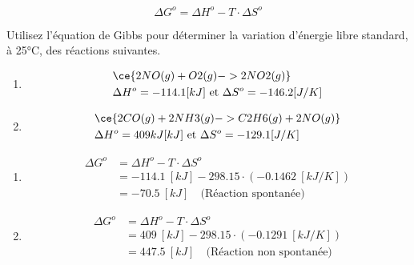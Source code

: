 \documentclass[
  11pt,
  a4paper,
  openany]{book}
\providecommand{\tightlist}{%
  \setlength{\itemsep}{0pt}\setlength{\parskip}{0pt}}
\begin{document}
\[
\Delta G^o = \Delta H^o - T \cdot \Delta S^o
\]

\begin{Exercise}

Utilisez l'équation de Gibbs pour déterminer la variation d'énergie libre standard, à 25°C, des réactions suivantes.

\begin{enumerate}
\def\labelenumi{\alph{enumi}.}
\tightlist
\item
  \[
  \begin{split}
  & \ce{2 NO(g) + O2(g) -> 2 NO2(g)} \\
  & \Delta H^o = -114.1 [kJ] \text{ et } \Delta S^o = -146.2 [J/K]
  \end{split}
  \]
\item
  \[
  \begin{split}
  & \ce{2 CO(g) + 2 NH3(g) -> C2H6(g) + 2 NO(g)} \\
  & \Delta H^o = 409 kJ [kJ] \text{ et } \Delta S^o = -129.1 [J/K]
  \end{split}
  \]
\end{enumerate}

\end{Exercise}

\begin{Answer}

\begin{enumerate}
\def\labelenumi{\alph{enumi}.}
\tightlist
\item
  \[
  \begin{split}
  \Delta G^o &= \Delta H^o - T \cdot \Delta S^o \\
  &= -114.1\ [kJ] - 298.15 \cdot (-0.1462\ [kJ/K]) \\
  &= -70.5\ [kJ] \quad \text{(Réaction spontanée)}
  \end{split}
  \]
\item
  \[
  \begin{split}
  \Delta G^o &= \Delta H^o - T \cdot \Delta S^o \\
  &= 409\ [kJ] - 298.15 \cdot (-0.1291\ [kJ/K]) \\
  &= 447.5\ [kJ] \quad \text{(Réaction non spontanée)}
  \end{split}
  \]
\end{enumerate}

\end{Answer}

\clearpage
\end{document}
